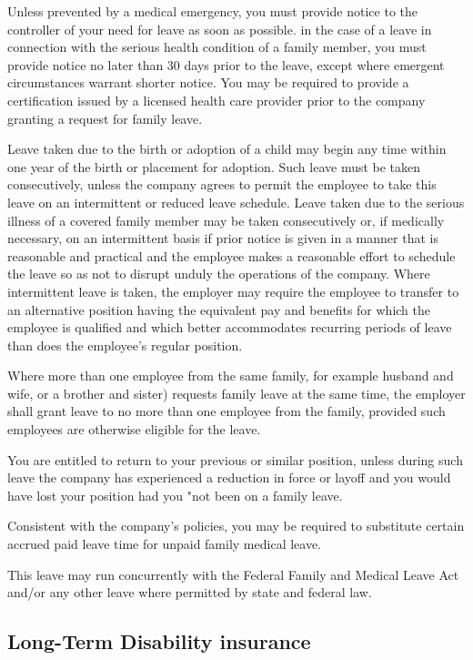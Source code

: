 Unless prevented by a medical emergency, you must provide notice to the controller of your need for leave as soon as possible. in the case of a leave in connection with the serious health condition of a family member, you must provide notice no later than 30 days prior to the leave, except where emergent circumstances warrant shorter notice. You may be required to provide a certification issued by a licensed health care provider prior to the company granting a request for family leave.

Leave taken due to the birth or adoption of a child may begin any time within one year of the birth or placement for adoption. Such leave must be taken consecutively, unless the company agrees to permit the employee to take this leave on an intermittent or reduced leave schedule. Leave taken due to the serious illness of a covered family member may be taken consecutively or, if medically necessary, on an intermittent basis if prior notice is given in a manner that is reasonable and practical and the employee makes a reasonable effort to schedule the leave so as not to disrupt unduly the operations of the company. Where intermittent leave is taken, the employer may require the employee to transfer to an alternative position having the equivalent pay and benefits for which the employee is qualified and which better accommodates recurring periods of leave than does the employee's regular position.

Where more than one employee from the same family, for example husband and wife, or a brother and sister) requests family leave at the same time, the employer shall grant leave to no more than one employee from the family, provided such employees are otherwise eligible for the leave.

You are entitled to return to your previous or similar position, unless during such leave the company has experienced a reduction in force or layoff and you would have lost your position had you "not been on a family leave.

Consistent with the company's policies, you may be required to substitute certain accrued paid leave time for unpaid family medical leave.

This leave may run concurrently with the Federal Family and Medical Leave Act and/or any other leave where permitted by state and federal law.

\subsection{Long-Term Disability insurance}

